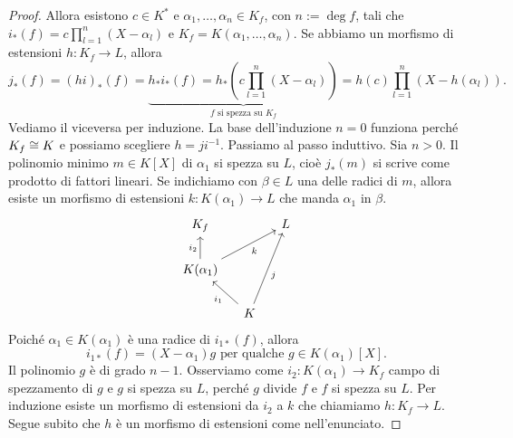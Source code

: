 \begin{proof}
Allora esistono $c \in K^\ast$ e $\alpha_1, \dots{}, \alpha_n \in K_f$, con $n := \deg f$, tali che $i_\ast(f) = c\prod_{l=1}^n(X-\alpha_l)$ e $K_f = K(\alpha_1,\dots,\alpha_n)$.\newline
Se abbiamo un morfismo di estensioni $h : K_f \to L$, allora
\[j_\ast(f) = (h i)_\ast (f) = \underbrace{h_\ast i_\ast (f) = h_\ast \left( c \prod_{l=1}^n (X-\alpha_l) \right)}_{f \text{ si spezza su } K_f} = h(c) \prod_{l=1}^n \left(X-h\left(\alpha_l\right)\right) .\]
Vediamo il viceversa per induzione.  La base dell'induzione $n=0$ funziona perché $K_f \cong K$ e possiamo scegliere $h = j i^{-1}$. Passiamo al passo induttivo. Sia $n > 0$. Il polinomio minimo $m \in K[X]$ di $\alpha_1$ si spezza su $L$, cioè $j_\ast(m)$ si scrive come prodotto di fattori lineari. Se indichiamo con $\beta \in L$ una delle radici di $m$, allora esiste un morfismo di estensioni $k : K(\alpha_1) \to L$ che manda $\alpha_1$ in $\beta$.
\[\begin{tikzcd}[column sep=small]
K_f  & & L \\
K(\alpha_1) \ar["{i_2}", u] \ar["k", urr, swap] \\
& K \ar["{i_1}", ul] \ar["j", uur, swap]
\end{tikzcd}\]
Poiché $\alpha_1 \in K(\alpha_1)$ è una radice di $i_{1\ast}(f)$, allora
\[i_{1\ast}(f) = (X-\alpha_1) g \text{ per qualche } g \in K(\alpha_1)[X] .\]
Il polinomio $g$ è di grado $n-1$. Osserviamo come $i_2 : K(\alpha_1) \to K_f$ campo di spezzamento di $g$ e $g$ si spezza su $L$, perché $g$ divide $f$ e $f$ si spezza su $L$. Per induzione esiste un morfismo di estensioni da $i_2$ a $k$ che chiamiamo $h : K_f \to L$. Segue subito che $h$ è un morfismo di estensioni come nell'enunciato.
\end{proof}

